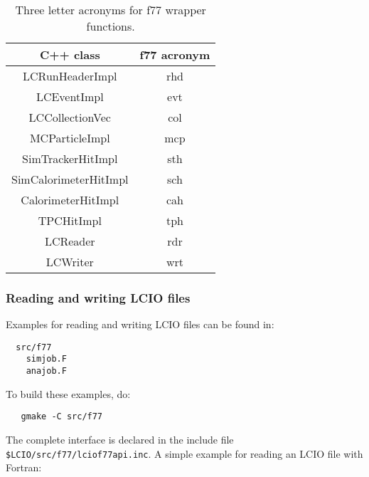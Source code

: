 \begin{table}
\begin{center}
\begin{tabular}{|c|c|}
\hline
\rule[-5mm]{0mm}{10mm} C++ class  &  f77 acronym   \\ \hline \hline

 LCRunHeaderImpl       & rhd \\ \hline
 LCEventImpl           & evt \\ \hline
 LCCollectionVec       & col \\ \hline
 MCParticleImpl        & mcp \\ \hline
 SimTrackerHitImpl     & sth \\ \hline
 SimCalorimeterHitImpl & sch \\ \hline
 CalorimeterHitImpl    & cah \\ \hline
 TPCHitImpl            & tph \\ \hline
 LCReader              & rdr \\ \hline
 LCWriter              & wrt \\ \hline

\end{tabular}
\end{center}
\caption{Three letter acronyms for f77 wrapper functions.}
\label{tab_f77}
\end{table}


\subsubsection{Reading and writing LCIO files}
Examples for reading and writing LCIO files can be found in:
\begin{verbatim}
  src/f77
    simjob.F
    anajob.F
\end{verbatim}
To build these examples, do:
\begin{verbatim}
   gmake -C src/f77
\end{verbatim}

The complete interface is declared in the include file \verb#$LCIO/src/f77/lciof77api.inc#. 
A simple example for reading an LCIO file with Fortran:

